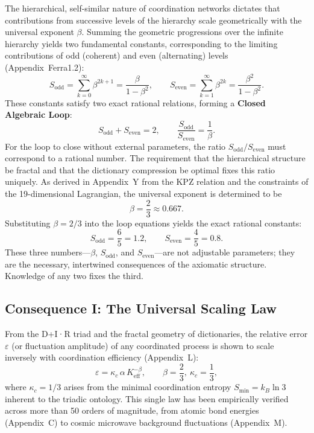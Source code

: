 \documentclass[11pt,a4paper]{article}
\begin{document}
The hierarchical, self-similar nature of coordination networks dictates that contributions from successive levels of the hierarchy scale geometrically with the universal exponent \(\beta\). Summing the geometric progressions over the infinite hierarchy yields two fundamental constants, corresponding to the limiting contributions of odd (coherent) and even (alternating) levels (Appendix~Ferra1.2):
\[
S_{\mathrm{odd}} = \sum_{k=0}^{\infty} \beta^{2k+1} = \frac{\beta}{1-\beta^{2}}, \qquad
S_{\mathrm{even}} = \sum_{k=1}^{\infty} \beta^{2k} = \frac{\beta^{2}}{1-\beta^{2}}.
\]
These constants satisfy two exact rational relations, forming a \textbf{Closed Algebraic Loop}:
\[
\boxed{S_{\mathrm{odd}} + S_{\mathrm{even}} = 2, \qquad \frac{S_{\mathrm{odd}}}{S_{\mathrm{even}}} = \frac{1}{\beta}}.
\]
For the loop to close without external parameters, the ratio \(S_{\mathrm{odd}}/S_{\mathrm{even}}\) must correspond to a rational number. The requirement that the hierarchical structure be fractal and that the dictionary compression be optimal fixes this ratio uniquely. As derived in Appendix~Y from the KPZ relation and the constraints of the 19-dimensional Lagrangian, the universal exponent is determined to be
\[
\beta = \frac{2}{3} \approx 0.667.
\]
Substituting \(\beta = 2/3\) into the loop equations yields the exact rational constants:
\[
S_{\mathrm{odd}} = \frac{6}{5} = 1.2,\qquad S_{\mathrm{even}} = \frac{4}{5} = 0.8.
\]
These three numbers---\(\beta\), \(S_{\mathrm{odd}}\), and \(S_{\mathrm{even}}\)---are not adjustable parameters; they are the necessary, intertwined consequences of the axiomatic structure. Knowledge of any two fixes the third.

\subsection{Consequence I: The Universal Scaling Law}
\label{subsec:consequence-scaling}

From the D+I·R triad and the fractal geometry of dictionaries, the relative error \(\varepsilon\) (or fluctuation amplitude) of any coordinated process is shown to scale inversely with coordination efficiency (Appendix~L):
\[
\boxed{\varepsilon = \kappa_c \, \alpha \, K_{\mathrm{eff}}^{-\beta}, \qquad \beta = \frac{2}{3},\ \kappa_c = \frac{1}{3}},
\]
where \(\kappa_c = 1/3\) arises from the minimal coordination entropy \(S_{\min} = k_B \ln 3\) inherent to the triadic ontology. This single law has been empirically verified across more than 50 orders of magnitude, from atomic bond energies (Appendix~C) to cosmic microwave background fluctuations (Appendix~M).
\end{document}
